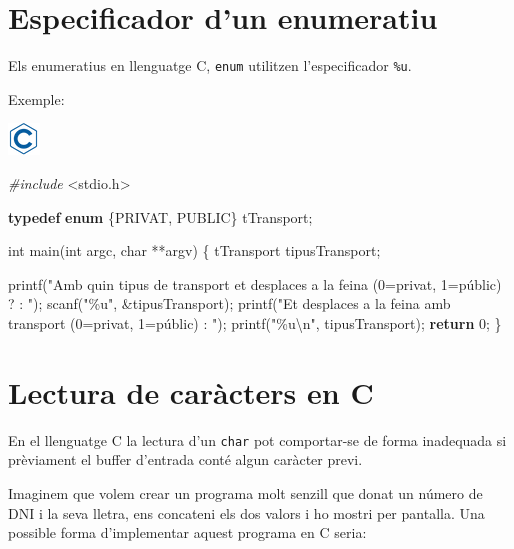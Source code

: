 \documentclass[
]{book}
\newenvironment{Shaded}{\begin{snugshade}}{\end{snugshade}}
\newcommand{\ControlFlowTok}[1]{\textcolor[rgb]{0.13,0.29,0.53}{\textbf{#1}}}
\newcommand{\DataTypeTok}[1]{\textcolor[rgb]{0.13,0.29,0.53}{#1}}
\newcommand{\DecValTok}[1]{\textcolor[rgb]{0.00,0.00,0.81}{#1}}
\newcommand{\ImportTok}[1]{#1}
\newcommand{\KeywordTok}[1]{\textcolor[rgb]{0.13,0.29,0.53}{\textbf{#1}}}
\newcommand{\NormalTok}[1]{#1}
\newcommand{\PreprocessorTok}[1]{\textcolor[rgb]{0.56,0.35,0.01}{\textit{#1}}}
\newcommand{\SpecialCharTok}[1]{\textcolor[rgb]{0.00,0.00,0.00}{#1}}
\newcommand{\StringTok}[1]{\textcolor[rgb]{0.31,0.60,0.02}{#1}}
\begin{document}
\hypertarget{especificador-dun-enumeratiu}{%
\section{Especificador d'un enumeratiu}\label{especificador-dun-enumeratiu}}

Els enumeratius en llenguatge C, \texttt{enum} utilitzen l'especificador \texttt{\%u}.

Exemple:

\includegraphics{./img/c.png}

\begin{Shaded}
\begin{Highlighting}[]
\PreprocessorTok{\#include }\ImportTok{\textless{}stdio.h\textgreater{}}

\KeywordTok{typedef} \KeywordTok{enum}\NormalTok{ \{PRIVAT, PUBLIC\} tTransport;}

\DataTypeTok{int}\NormalTok{ main(}\DataTypeTok{int}\NormalTok{ argc, }\DataTypeTok{char}\NormalTok{ **argv) \{}
\NormalTok{    tTransport tipusTransport;}

\NormalTok{    printf(}\StringTok{"Amb quin tipus de transport et desplaces a la feina (0=privat, 1=públic) ? : "}\NormalTok{);}
\NormalTok{    scanf(}\StringTok{"\%u"}\NormalTok{, \&tipusTransport);}
\NormalTok{    printf(}\StringTok{"Et desplaces a la feina amb transport (0=privat, 1=públic) : "}\NormalTok{);}
\NormalTok{    printf(}\StringTok{"\%u}\SpecialCharTok{\textbackslash{}n}\StringTok{"}\NormalTok{, tipusTransport);}
    \ControlFlowTok{return} \DecValTok{0}\NormalTok{;}
\NormalTok{\}}
\end{Highlighting}
\end{Shaded}

\hypertarget{lectura-de-caruxe0cters-en-c}{%
\section{Lectura de caràcters en C}\label{lectura-de-caruxe0cters-en-c}}

En el llenguatge C la lectura d'un \texttt{char} pot comportar-se de forma inadequada si prèviament el buffer d'entrada conté algun caràcter previ.

Imaginem que volem crear un programa molt senzill que donat un número de DNI i la seva lletra, ens concateni els dos valors i ho mostri per pantalla. Una possible forma d'implementar aquest programa en C seria:
\end{document}
